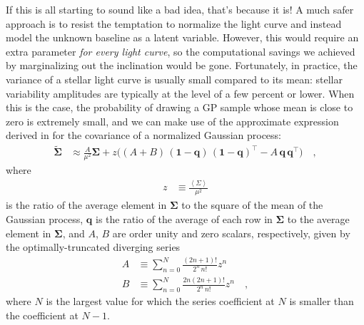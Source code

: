 \documentclass[modern]{aastex62}
\begin{document}
If this is all starting to sound like a bad idea, that's because it is!
A much safer approach is to resist the temptation to normalize the light curve
and instead model the unknown baseline as a latent variable. However,
this would require an extra parameter \emph{for every light curve}, so the
computational savings we achieved by marginalizing out the inclination
would be gone. Fortunately, in practice, the variance of a stellar light curve
is usually small compared to its mean: stellar variability amplitudes are
typically at the level of a few percent or lower. When this is the case,
the probability of drawing a GP sample whose mean is close to zero is
extremely small, and we can make use of the approximate expression derived
in \citet{Luger2020} for the covariance of a normalized Gaussian process:
%
\begin{align}
    \label{eq:SigmaTilde}
    \tilde{\pmb{\Sigma}}
     & \approx
    \frac{A}{\mu^2} \pmb{\Sigma} +
    z \Big(
    (A + B) \, (\mathbf{1} - \mathbf{q}) \, (\mathbf{1} - \mathbf{q})^\top
    - A \, \mathbf{q} \, \mathbf{q}^\top
    \Big)
    \quad,
\end{align}
%
where
%
\begin{align}
    z & \equiv \frac{\left< \Sigma \right>}{\mu^2}
\end{align}
%
is the ratio of the average element in $\pmb{\Sigma}$
to the square of the mean of the Gaussian process,
$\mathbf{q}$ is the ratio of the average of each row in $\pmb{\Sigma}$
to the average element in $\pmb{\Sigma}$, and $A$, $B$ are
order unity and zero scalars, respectively,
given by the optimally-truncated diverging series
%
\begin{align}
    \label{eq:baseline_alpha}
    A
     & \equiv
    \sum\limits_{n=0}^N
    \frac{(2n + 1)!}{2^n \, n!}
    z^n
    \\[1em]
    \label{eq:baseline_beta}
    B
     & \equiv
    \sum\limits_{n=0}^N
    \frac{2n(2n + 1)!}{2^n \, n!}
    z^n
    \quad,
\end{align}
%
where $N$ is the largest value for which the series coefficient at $N$ is
smaller than the coefficient at $N - 1$.

\end{document}
